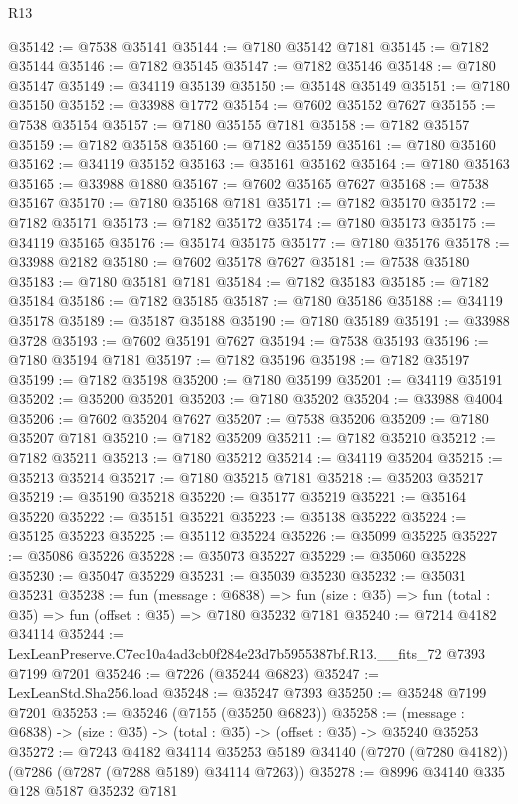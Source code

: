 \begin{lexlean}{R13}
\begin{coremodule}
@35142 := @7538 @35141
@35144 := @7180 @35142 @7181
@35145 := @7182 @35144
@35146 := @7182 @35145
@35147 := @7182 @35146
@35148 := @7180 @35147
@35149 := @34119 @35139
@35150 := @35148 @35149
@35151 := @7180 @35150
@35152 := @33988 @1772
@35154 := @7602 @35152 @7627
@35155 := @7538 @35154
@35157 := @7180 @35155 @7181
@35158 := @7182 @35157
@35159 := @7182 @35158
@35160 := @7182 @35159
@35161 := @7180 @35160
@35162 := @34119 @35152
@35163 := @35161 @35162
@35164 := @7180 @35163
@35165 := @33988 @1880
@35167 := @7602 @35165 @7627
@35168 := @7538 @35167
@35170 := @7180 @35168 @7181
@35171 := @7182 @35170
@35172 := @7182 @35171
@35173 := @7182 @35172
@35174 := @7180 @35173
@35175 := @34119 @35165
@35176 := @35174 @35175
@35177 := @7180 @35176
@35178 := @33988 @2182
@35180 := @7602 @35178 @7627
@35181 := @7538 @35180
@35183 := @7180 @35181 @7181
@35184 := @7182 @35183
@35185 := @7182 @35184
@35186 := @7182 @35185
@35187 := @7180 @35186
@35188 := @34119 @35178
@35189 := @35187 @35188
@35190 := @7180 @35189
@35191 := @33988 @3728
@35193 := @7602 @35191 @7627
@35194 := @7538 @35193
@35196 := @7180 @35194 @7181
@35197 := @7182 @35196
@35198 := @7182 @35197
@35199 := @7182 @35198
@35200 := @7180 @35199
@35201 := @34119 @35191
@35202 := @35200 @35201
@35203 := @7180 @35202
@35204 := @33988 @4004
@35206 := @7602 @35204 @7627
@35207 := @7538 @35206
@35209 := @7180 @35207 @7181
@35210 := @7182 @35209
@35211 := @7182 @35210
@35212 := @7182 @35211
@35213 := @7180 @35212
@35214 := @34119 @35204
@35215 := @35213 @35214
@35217 := @7180 @35215 @7181
@35218 := @35203 @35217
@35219 := @35190 @35218
@35220 := @35177 @35219
@35221 := @35164 @35220
@35222 := @35151 @35221
@35223 := @35138 @35222
@35224 := @35125 @35223
@35225 := @35112 @35224
@35226 := @35099 @35225
@35227 := @35086 @35226
@35228 := @35073 @35227
@35229 := @35060 @35228
@35230 := @35047 @35229
@35231 := @35039 @35230
@35232 := @35031 @35231
@35238 := fun (message : @6838) =>
  fun (size : @35) => fun (total : @35) => fun (offset : @35) => @7180 @35232 @7181
@35240 := @7214 @4182 @34114
@35244 := LexLeanPreserve.C7ec10a4ad3cb0f284e23d7b5955387bf.R13.__fits_72 @7393 @7199 @7201
@35246 := @7226 (@35244 @6823)
@35247 := LexLeanStd.Sha256.load
@35248 := @35247 @7393
@35250 := @35248 @7199 @7201
@35253 := @35246 (@7155 (@35250 @6823))
@35258 := (message : @6838) -> (size : @35) -> (total : @35) -> (offset : @35) -> @35240 @35253
@35272 := @7243
    @4182
    @34114
    @35253
    @5189
    @34140
    (@7270 (@7280 @4182))
    (@7286 (@7287 (@7288 @5189) @34114 @7263))
@35278 := @8996 @34140 @335 @128 @5187 @35232 @7181

\end{coremodule}
\end{lexlean}
